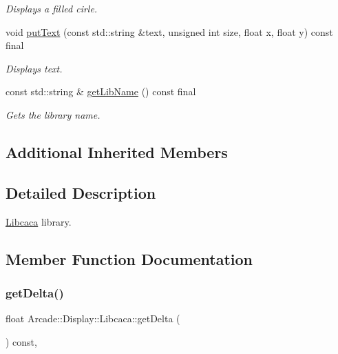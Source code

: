 \begin{DoxyCompactItemize}
\begin{DoxyCompactList}\small\item\em Displays a filled cirle. \end{DoxyCompactList}\item 
void \mbox{\hyperlink{classArcade_1_1Display_1_1Libcaca_a2d4198dc8e383672ac00114d10b11e01}{put\+Text}} (const std\+::string \&text, unsigned int size, float x, float y) const final
\begin{DoxyCompactList}\small\item\em Displays text. \end{DoxyCompactList}\item 
const std\+::string \& \mbox{\hyperlink{classArcade_1_1Display_1_1Libcaca_a26e6dd02a853963fdcb812bddb3dee1e}{get\+Lib\+Name}} () const final
\begin{DoxyCompactList}\small\item\em Gets the library name. \end{DoxyCompactList}\end{DoxyCompactItemize}
\subsection*{Additional Inherited Members}


\subsection{Detailed Description}
\mbox{\hyperlink{classArcade_1_1Display_1_1Libcaca}{Libcaca}} library. 

\subsection{Member Function Documentation}
\mbox{\label{classArcade_1_1Display_1_1Libcaca_a6aee007c10e66709680d1ec80f2662a4}} 
\subsubsection{\texorpdfstring{getDelta()}{getDelta()}}
{\footnotesize\ttfamily float Arcade\+::\+Display\+::\+Libcaca\+::get\+Delta (\begin{DoxyParamCaption}{ }\end{DoxyParamCaption}) const\hspace{0.3cm}{\ttfamily [final]}, {\ttfamily [virtual]}}



